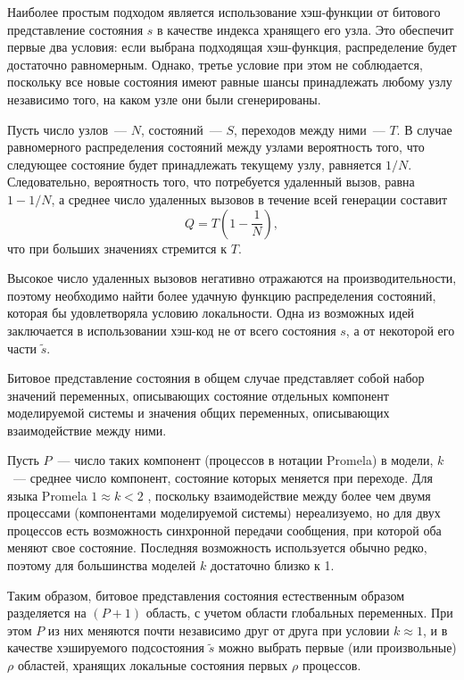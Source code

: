 \documentclass[12pt,a4paper,fleqn]{article}
\begin{document}
Наиболее простым подходом является использование хэш-функции от битового представление состояния $s$ в качестве индекса
хранящего его узла.
Это обеспечит первые два условия: если выбрана подходящая хэш-функция, распределение будет
достаточно равномерным.
Однако, третье условие при этом не соблюдается, поскольку все новые состояния имеют равные шансы
принадлежать любому узлу независимо того, на каком узле они были сгенерированы.

Пусть число узлов~--- $N$, состояний~--- $S$, переходов между ними~--- $T$.
В случае равномерного распределения состояний между узлами вероятность того, что следующее состояние будет принадлежать текущему узлу, равняется $1/N$.
Следовательно, вероятность того, что потребуется удаленный вызов, равна $1 - 1/N$, а среднее число удаленных
вызовов в течение всей генерации составит
\begin{equation}
  \label{eq:rpc-partfull}
  Q = T (1 - \frac{1}{N}),
\end{equation}
что при больших значениях стремится к $T$.

Высокое число удаленных вызовов негативно отражаются на производительности, поэтому необходимо найти более удачную
функцию распределения состояний, которая бы удовлетворяла условию локальности.
Одна из возможных идей заключается в использовании хэш-код не от всего состояния $s$, а от некоторой его части $\tilde{s}$.

Битовое представление состояния в общем случае представляет собой набор значений переменных, описывающих состояние отдельных компонент моделируемой системы и значения общих переменных, описывающих взаимодействие между ними.

Пусть $P$~--- число таких компонент (процессов в нотации Promela) в модели, $k$~--- среднее число компонент, состояние которых меняется при переходе. Для языка Promela $1 \approx k < 2$ , поскольку взаимодействие между более чем двумя процессами (компонентами моделируемой системы) нереализуемо, но для двух процессов есть возможность синхронной передачи сообщения, при которой оба меняют свое состояние.
Последняя возможность используется обычно редко, поэтому для большинства моделей $k$ достаточно близко к 1.

Таким образом, битовое представления состояния естественным образом разделяется на $(P+1)$ область, с учетом области глобальных переменных.
При этом $P$ из них меняются почти независимо друг от друга при условии $k \approx 1$, и в качестве хэшируемого подсостояния $\tilde{s}$ можно выбрать первые (или произвольные) $\rho$ областей, хранящих локальные состояния первых $\rho$ процессов.
\end{document}
